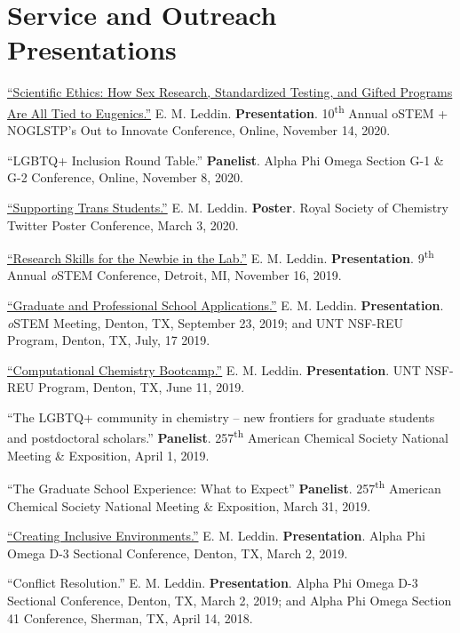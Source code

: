 \documentclass[letterpaper,11pt]{article}
\begin{document}
\section{Service and Outreach Presentations}
\begin{etaremune}
\small{
  \item \textnormal{\href{https://bit.ly/2020-oSTEM-Ethics}{``Scientific Ethics: How Sex Research, Standardized Testing, and Gifted Programs Are All Tied to Eugenics.''} E. M. Leddin. \textbf{Presentation}. 10\textsuperscript{th} Annual oSTEM + NOGLSTP's Out to Innovate\texttrademark{} Conference, Online, November 14, 2020.}
  \item \textnormal{``LGBTQ+ Inclusion Round Table.'' \textbf{Panelist}. Alpha Phi Omega Section G-1 \& G-2 Conference, Online, November 8, 2020.}
  \item \textnormal{\href{https://twitter.com/EmLedd1/status/1234812260515749889?s=20}{``Supporting Trans Students.''} E. M. Leddin. \textbf{Poster}. Royal Society of Chemistry Twitter Poster Conference, March 3, 2020.}
  \item \textnormal{\href{http://bit.ly/2019-oSTEM-PROF10}{``Research Skills for the Newbie in the Lab.''} E. M. Leddin. \textbf{Presentation}. 9\textsuperscript{th} Annual \emph{o}STEM Conference, Detroit, MI, November 16, 2019.}
\item \textnormal{\href{https://www.youtube.com/watch?v=6VkSUhsZr40&feature=youtu.be}{``Graduate and Professional School Applications.''} E. M. Leddin. \textbf{Presentation}. \emph{o}STEM Meeting, Denton, TX, September 23, 2019; and UNT NSF-REU Program, Denton, TX, July, 17 2019.}
  \item \textnormal{\href{http://bit.ly/2019-UNTREU-CCBC}{``Computational Chemistry Bootcamp.''} E. M. Leddin. \textbf{Presentation}. UNT NSF-REU Program, Denton, TX, June 11, 2019.}
  \item \textnormal{``The LGBTQ+ community in chemistry -- new frontiers for graduate students and postdoctoral scholars.'' \textbf{Panelist}. 257\textsuperscript{th} American Chemical Society National Meeting \& Exposition, April 1, 2019.}
  \item \textnormal{``The Graduate School Experience: What to Expect'' \textbf{Panelist}. 257\textsuperscript{th} American Chemical Society National Meeting \& Exposition, March 31, 2019.}
  \item \textnormal{ \href{https://docs.google.com/presentation/d/1mKDUxe-elMQ7EkTBglIQBeZlcsdBwmfP5loLxAsshF0/edit}{``Creating Inclusive Environments.''} E. M. Leddin. \textbf{Presentation}. Alpha Phi Omega D-3 Sectional Conference, Denton, TX, March 2, 2019.}
  \item \textnormal{``Conflict Resolution.'' E. M. Leddin. \textbf{Presentation}. Alpha Phi Omega D-3 Sectional Conference, Denton, TX, March 2, 2019; and Alpha Phi Omega Section 41 Conference, Sherman, TX, April 14, 2018.}
  }
\end{etaremune}
\end{document}
